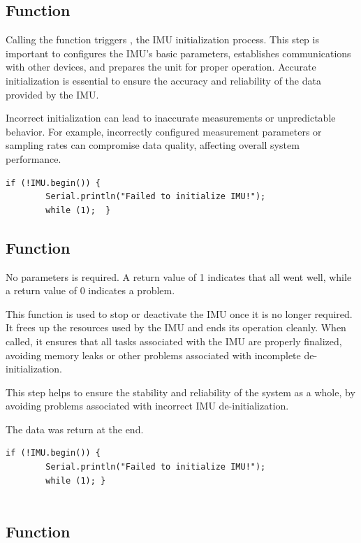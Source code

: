 \subsection{Function }


Calling the function triggers  , the IMU initialization process. This step is important to configures the IMU's basic parameters, establishes communications with other devices, and prepares the unit for proper operation. Accurate initialization is essential to ensure the accuracy and reliability of the data provided by the IMU. \cite{arduino_lsm9ds1:2024}

Incorrect initialization can lead to inaccurate measurements or unpredictable behavior. For example, incorrectly configured measurement parameters or sampling rates can compromise data quality, affecting overall system performance.


\begin{lstlisting}[style= Arduino]
	if (!IMU.begin()) {
		Serial.println("Failed to initialize IMU!");
		while (1);	}
\end{lstlisting}


\subsection{Function } 

No parameters is required. A return value of 1 indicates that all went well, while a return value of 0 indicates a problem. \cite{arduino_lsm9ds1:2024}

This function is used to stop or deactivate the IMU once it is no longer required. It frees up the resources used by the IMU and ends its operation cleanly. When called, it ensures that all tasks associated with the IMU are properly finalized, avoiding memory leaks or other problems associated with incomplete de-initialization.

This step helps to ensure the stability and reliability of the system as a whole, by avoiding problems associated with incorrect IMU de-initialization.

The data was return at the end. 

\begin{lstlisting}[style=Arduino]
	if (!IMU.begin()) {
		Serial.println("Failed to initialize IMU!");
		while (1); }
			
\end{lstlisting}


\subsection{Function }

